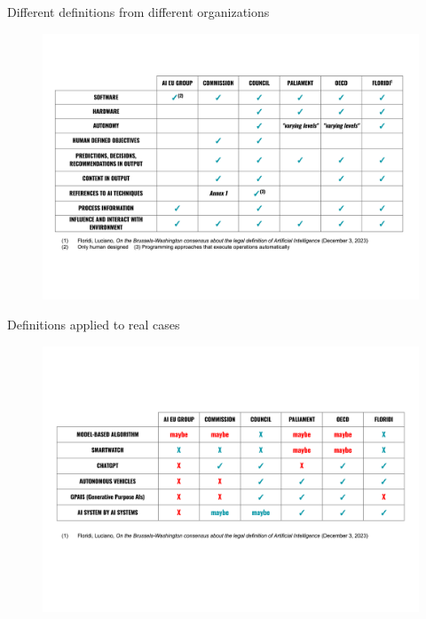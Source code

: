 \documentclass{beamer}
\begin{document}
\begin{frame}{Different definitions from different organizations}
    \begin{figure}
    \includegraphics[width=1\linewidth]{img/image-001.png}
    \end{figure}
\end{frame}

\begin{frame}{Definitions applied to real cases}
    \begin{figure}
    \includegraphics[width=1\linewidth]{img/image-002.png}
    \end{figure}
\end{frame}
\end{document}
